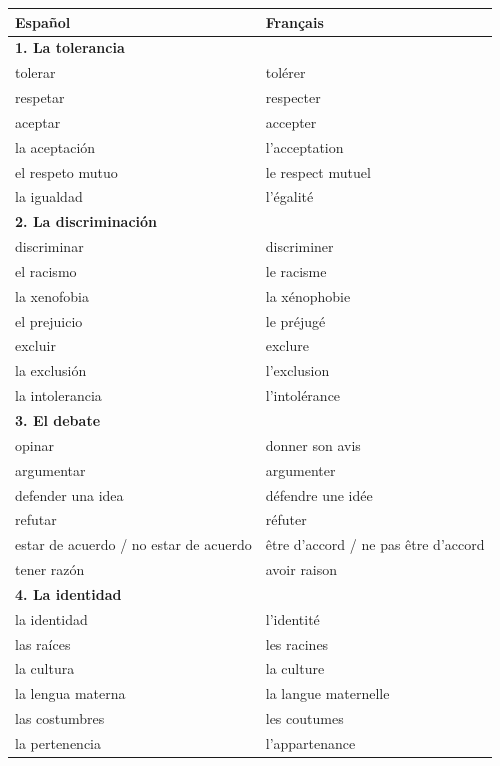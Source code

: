 \documentclass[11pt]{article}
\begin{document}
\begin{center}
\begin{tabularx}{\linewidth}{|X|X|}\hline
\rowcolor{popblueL} \textbf{Español} & \textbf{Français} \\ \hline
\multicolumn{2}{|l|}{\cellcolor{popgreenL}\textbf{1. La tolerancia}} \\ \hline
tolerar & tolérer \\ \hline
respetar & respecter \\ \hline
aceptar & accepter \\ \hline
la aceptación & l'acceptation \\ \hline
el respeto mutuo & le respect mutuel \\ \hline
la igualdad & l'égalité \\ \hline
\multicolumn{2}{|l|}{\cellcolor{popgreenL}\textbf{2. La discriminación}} \\ \hline
discriminar & discriminer \\ \hline
el racismo & le racisme \\ \hline
la xenofobia & la xénophobie \\ \hline
el prejuicio & le préjugé \\ \hline
excluir & exclure \\ \hline
la exclusión & l'exclusion \\ \hline
la intolerancia & l'intolérance \\ \hline
\multicolumn{2}{|l|}{\cellcolor{popgreenL}\textbf{3. El debate}} \\ \hline
opinar & donner son avis \\ \hline
argumentar & argumenter \\ \hline
defender una idea & défendre une idée \\ \hline
refutar & réfuter \\ \hline
estar de acuerdo / no estar de acuerdo & être d'accord / ne pas être d'accord \\ \hline
tener razón & avoir raison \\ \hline
\multicolumn{2}{|l|}{\cellcolor{popgreenL}\textbf{4. La identidad}} \\ \hline
la identidad & l'identité \\ \hline
las raíces & les racines \\ \hline
la cultura & la culture \\ \hline
la lengua materna & la langue maternelle \\ \hline
las costumbres & les coutumes \\ \hline
la pertenencia & l'appartenance \\ \hline
\end{tabularx}
\end{center}
\end{document}
